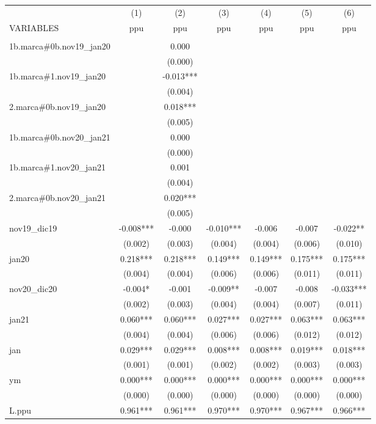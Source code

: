 \begin{tabular}{lcccccc} \hline
 & (1) & (2) & (3) & (4) & (5) & (6) \\
VARIABLES & ppu & ppu & ppu & ppu & ppu & ppu \\ \hline
 &  &  &  &  &  &  \\
1b.marca\#0b.nov19\_jan20 &  & 0.000 &  &  &  &  \\
 &  & (0.000) &  &  &  &  \\
1b.marca\#1.nov19\_jan20 &  & -0.013*** &  &  &  &  \\
 &  & (0.004) &  &  &  &  \\
2.marca\#0b.nov19\_jan20 &  & 0.018*** &  &  &  &  \\
 &  & (0.005) &  &  &  &  \\
1b.marca\#0b.nov20\_jan21 &  & 0.000 &  &  &  &  \\
 &  & (0.000) &  &  &  &  \\
1b.marca\#1.nov20\_jan21 &  & 0.001 &  &  &  &  \\
 &  & (0.004) &  &  &  &  \\
2.marca\#0b.nov20\_jan21 &  & 0.020*** &  &  &  &  \\
 &  & (0.005) &  &  &  &  \\
nov19\_dic19 & -0.008*** & -0.000 & -0.010*** & -0.006 & -0.007 & -0.022** \\
 & (0.002) & (0.003) & (0.004) & (0.004) & (0.006) & (0.010) \\
jan20 & 0.218*** & 0.218*** & 0.149*** & 0.149*** & 0.175*** & 0.175*** \\
 & (0.004) & (0.004) & (0.006) & (0.006) & (0.011) & (0.011) \\
nov20\_dic20 & -0.004* & -0.001 & -0.009** & -0.007 & -0.008 & -0.033*** \\
 & (0.002) & (0.003) & (0.004) & (0.004) & (0.007) & (0.011) \\
jan21 & 0.060*** & 0.060*** & 0.027*** & 0.027*** & 0.063*** & 0.063*** \\
 & (0.004) & (0.004) & (0.006) & (0.006) & (0.012) & (0.012) \\
jan & 0.029*** & 0.029*** & 0.008*** & 0.008*** & 0.019*** & 0.018*** \\
 & (0.001) & (0.001) & (0.002) & (0.002) & (0.003) & (0.003) \\
ym & 0.000*** & 0.000*** & 0.000*** & 0.000*** & 0.000*** & 0.000*** \\
 & (0.000) & (0.000) & (0.000) & (0.000) & (0.000) & (0.000) \\
L.ppu & 0.961*** & 0.961*** & 0.970*** & 0.970*** & 0.967*** & 0.966*** \\

\end{tabular}
